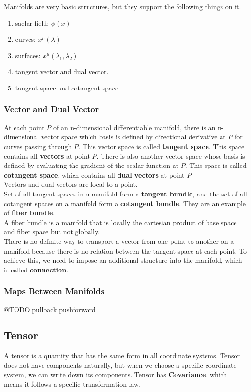 \documentclass[12pt]{article}
\theoremstyle{mystyle}{\newtheorem{definition}{Definition}[subsection]}
\theoremstyle{mystyle}{\newtheorem{theorem}[definition]{Theorem}}
\theoremstyle{mystyle}{\newtheorem*{remark}{Remark}}
\theoremstyle{mystyle}{\newtheorem{example}{Example}[subsection]}
\theoremstyle{mystyle}{\newtheorem{examples}{Examples}[subsection]}
\theoremstyle{mystyle}{\newtheorem{cthm}{}[subsection]}
\begin{document}
Manifolds are very basic structures, but they support the following things on it.
\begin{enumerate}
  \item saclar field: \(\phi(x)\)
  \item curves: \(x^{\mu}(\lambda)\)
  \item surfaces: \(x^{\mu}(\lambda_1, \lambda_2)\)
  \item tangent vector and dual vector.
  \item tangent space and cotangent space.
\end{enumerate}

\subsubsection{Vector and Dual Vector}
At each point $P$ of an n-dimensional differentiable manifold, there is an n-dimensional vector space
which basis is defined by directional derivative at $P$ for curves passing through $P$.
This vector space is called \textbf{tangent space}. This space contains all \textbf{vectors} at point $P$.
There is also another vector space whose basis is defined by evaluating the gradient of the scalar function at $P$.
This space is called \textbf{cotangent space}, which contains all \textbf{dual vectors} at point $P$.\\
Vectors and dual vectors are local to a point.\\
Set of all tangent spaces in a manifold form a \textbf{tangent bundle}, and the set of all cotangent spaces on a manifold
form a \textbf{cotangent bundle}. They are an example of \textbf{fiber bundle}.\\
A fiber bundle is a manifold that is locally the cartesian product of base space and fiber space but not globally.\\
There is no definite way to transport a vector from one point to another on a manifold
because there is no relation between the tangent space at each point. To achieve this,
we need to impose an additional structure into the manifold, which is called \textbf{connection}.


\subsubsection{Maps Between Manifolds}
@TODO
pullback
pushforward


\subsection{Tensor}
A tensor is a quantity that has the same form in all coordinate systems.
Tensor does not have components naturally, but when we choose a specific coordinate system, we can write down its components.
Tensor has \textbf{Covariance}, which means it follows a specific transformation law.
\end{document}
